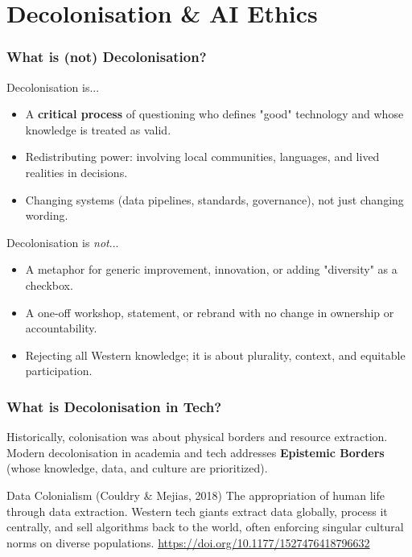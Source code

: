 \documentclass[xcolor=table]{beamer}
\begin{document}
\section{Decolonisation \& AI Ethics}

\begin{frame}
    \frametitle{What is (not) Decolonisation?}
    \footnotesize
    \begin{block}{Decolonisation is...}
        \begin{itemize}
            \item A \textbf{critical process} of questioning who defines "good" technology and whose knowledge is treated as valid.
            \item Redistributing power: involving local communities, languages, and lived realities in decisions.
            \item Changing systems (data pipelines, standards, governance), not just changing wording.
        \end{itemize}
    \end{block}

    \begin{alertblock}{Decolonisation is \textit{not}...}
        \begin{itemize}
            \item A metaphor for generic improvement, innovation, or adding "diversity" as a checkbox.
            \item A one-off workshop, statement, or rebrand with no change in ownership or accountability.
            \item Rejecting all Western knowledge; it is about plurality, context, and equitable participation.
        \end{itemize}
    \end{alertblock}
\end{frame}


\begin{frame}
    \frametitle{What is Decolonisation in Tech?}
    Historically, colonisation was about physical borders and resource extraction. Modern decolonisation in academia and tech addresses \textbf{Epistemic Borders} (whose knowledge, data, and culture are prioritized).
    
    \vspace{0.3cm}
    \begin{block}{Data Colonialism (Couldry \& Mejias, 2018)}
        The appropriation of human life through data extraction. Western tech giants extract data globally, process it centrally, and sell algorithms back to the world, often enforcing singular cultural norms on diverse populations. \url{https://doi.org/10.1177/1527476418796632}
    \end{block}
\end{frame}
\end{document}
